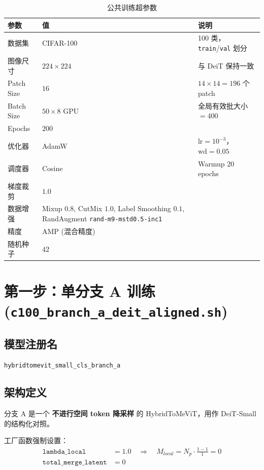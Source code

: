 \documentclass[a4paper,11pt]{article}
\begin{document}
\begin{table}[h]
\centering
\caption{公共训练超参数}
\begin{tabular}{l l p{8cm}}
\toprule
\textbf{参数} & \textbf{值} & \textbf{说明} \\
\midrule
数据集 & CIFAR-100 & 100 类，\texttt{train}/\texttt{val} 划分 \\
图像尺寸 & $224 \times 224$ & 与 DeiT 保持一致 \\
Patch Size & $16$ & $14 \times 14 = 196$ 个 patch \\
Batch Size & $50 \times 8$ GPU & 全局有效批大小 $= 400$ \\
Epochs & $200$ & \\
优化器 & AdamW & $\text{lr}=10^{-3}$，$\text{wd}=0.05$ \\
调度器 & Cosine & Warmup $20$ epochs \\
梯度裁剪 & $1.0$ & \\
数据增强 & \makecell[l]{Mixup $0.8$, CutMix $1.0$, \\ Label Smoothing $0.1$, \\ RandAugment \texttt{rand-m9-mstd0.5-inc1}} & \\
精度 & AMP (混合精度) & \\
随机种子 & $42$ & \\
\bottomrule
\end{tabular}
\end{table}

\section{第一步：单分支 A 训练 (\texttt{c100\_branch\_a\_deit\_aligned.sh})}

\subsection{模型注册名}

\texttt{hybridtomevit\_small\_cls\_branch\_a}

\subsection{架构定义}

分支 A 是一个 \textbf{不进行空间 token 降采样} 的 HybridToMeViT，用作 DeiT-Small 的结构化对照。

工厂函数强制设置：
\begin{align*}
    \texttt{lambda\_local} &= 1.0 \quad \Rightarrow \quad M_{local} = N_p \cdot \frac{1-1}{1} = 0 \\
    \texttt{total\_merge\_latent} &= 0
\end{align*}
\end{document}
